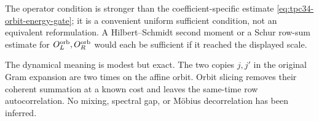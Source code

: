 \begin{remark}
The operator condition is stronger than the coefficient-specific
estimate \eqref{eq:tpc34-orbit-energy-gate}; it is a convenient uniform
sufficient condition, not an equivalent reformulation.  A
Hilbert--Schmidt second moment or a Schur row-sum estimate for
\(O_L^{\rm orb},O_R^{\rm orb}\) would each be sufficient if it reached
the displayed scale.
\end{remark}

The dynamical meaning is modest but exact.  The two copies \(j,j'\) in
the original Gram expansion are two times on the affine orbit.  Orbit
slicing removes their coherent summation at a known cost and leaves the
same-time row autocorrelation.  No mixing, spectral gap, or M\"obius
decorrelation has been inferred.
